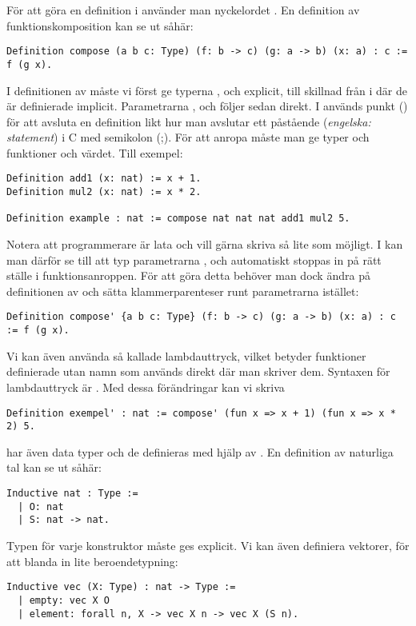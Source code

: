 För att göra en definition i \coq{} använder man nyckelordet . En
definition av funktionskomposition kan se ut såhär:
\begin{lstlisting}
Definition compose (a b c: Type) (f: b -> c) (g: a -> b) (x: a) : c := f (g x).
\end{lstlisting}
I definitionen av  måste vi först ge typerna ,  och 
explicit, till skillnad från i \haskell{} där de är definierade implicit.
Parametrarna ,  och  följer sedan direkt. I \coq{} används punkt
() för att avsluta en definition likt hur man avslutar ett påstående
(\emph{engelska: statement}) i C med semikolon (;). För att anropa 
måste man ge typer och funktioner och värdet. Till exempel:
\begin{lstlisting}
Definition add1 (x: nat) := x + 1.
Definition mul2 (x: nat) := x * 2.

Definition example : nat := compose nat nat nat add1 mul2 5.
\end{lstlisting}
Notera att programmerare är lata och vill gärna skriva så lite som möjligt. I
\coq{} kan man därför se till att typ parametrarna ,  och 
automatiskt stoppas in på rätt ställe i funktionsanroppen. För att göra detta
behöver man dock ändra på definitionen av  och sätta
klammerparenteser runt parametrarna istället:
\begin{lstlisting}
Definition compose' {a b c: Type} (f: b -> c) (g: a -> b) (x: a) : c := f (g x).
\end{lstlisting}
Vi kan även använda så kallade lambdauttryck, vilket betyder funktioner
definierade utan namn som används direkt där man skriver dem. Syntaxen för
lambdauttryck är . Med dessa förändringar kan
vi skriva
\begin{lstlisting}
Definition exempel' : nat := compose' (fun x => x + 1) (fun x => x * 2) 5.
\end{lstlisting}
\coq{} har även data typer och de definieras med hjälp av . En
definition av naturliga tal kan se ut såhär:
\begin{lstlisting}
Inductive nat : Type :=
  | O: nat
  | S: nat -> nat.
\end{lstlisting}
Typen för varje konstruktor måste ges explicit. Vi kan även definiera vektorer, för
att blanda in lite beroendetypning:
\begin{lstlisting}
Inductive vec (X: Type) : nat -> Type :=
  | empty: vec X O
  | element: forall n, X -> vec X n -> vec X (S n).
\end{lstlisting}
